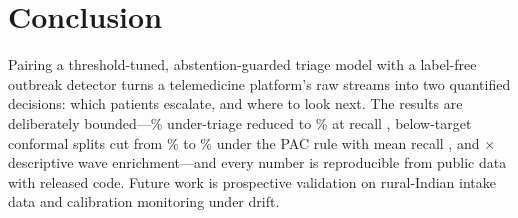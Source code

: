 \documentclass[conference]{IEEEtran}
\begin{document}
\section{Conclusion}
\label{sec:conclusion}

Pairing a threshold-tuned, abstention-guarded triage model with a
label-free outbreak detector turns a telemedicine platform's raw streams into
two quantified decisions: which patients escalate, and where to look next.
The results are deliberately bounded---\UnderTPct\% under-triage reduced to
\NestedUnderPct\% at recall \NestedRecall, below-target conformal splits cut
from \CBelowPct\% to \PacBelowPct\% under the PAC rule with mean recall
\PacMeanR{}, and \DeltaEnr$\times${} descriptive wave enrichment---and every
number is reproducible from public data with released code. Future work is
prospective validation on rural-Indian intake data and calibration
monitoring under drift.



\end{document}
